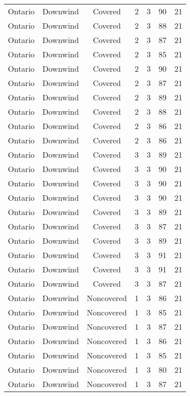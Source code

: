 \documentclass{article}
\begin{document}
\begin{longtable}[H]{ccccccc}
Ontario & Downwind & Covered     & 2 & 3    & 90  & 21 \\
Ontario & Downwind & Covered     & 2 & 3    & 88  & 21 \\
Ontario & Downwind & Covered     & 2 & 3    & 87  & 21 \\
Ontario & Downwind & Covered     & 2 & 3    & 85  & 21 \\
Ontario & Downwind & Covered     & 2 & 3    & 90  & 21 \\
Ontario & Downwind & Covered     & 2 & 3    & 87  & 21 \\
Ontario & Downwind & Covered     & 2 & 3    & 89  & 21 \\
Ontario & Downwind & Covered     & 2 & 3    & 88  & 21 \\
Ontario & Downwind & Covered     & 2 & 3    & 86  & 21 \\
Ontario & Downwind & Covered     & 2 & 3    & 86  & 21 \\
Ontario & Downwind & Covered     & 3 & 3    & 89  & 21 \\
Ontario & Downwind & Covered     & 3 & 3    & 90  & 21 \\
Ontario & Downwind & Covered     & 3 & 3    & 90  & 21 \\
Ontario & Downwind & Covered     & 3 & 3    & 90  & 21 \\
Ontario & Downwind & Covered     & 3 & 3    & 89  & 21 \\
Ontario & Downwind & Covered     & 3 & 3    & 87  & 21 \\
Ontario & Downwind & Covered     & 3 & 3    & 89  & 21 \\
Ontario & Downwind & Covered     & 3 & 3    & 91  & 21 \\
Ontario & Downwind & Covered     & 3 & 3    & 91  & 21 \\
Ontario & Downwind & Covered     & 3 & 3    & 87  & 21 \\
Ontario & Downwind & Noncovered & 1 & 3    & 86  & 21 \\
Ontario & Downwind & Noncovered & 1 & 3    & 85  & 21 \\
Ontario & Downwind & Noncovered & 1 & 3    & 87  & 21 \\
Ontario & Downwind & Noncovered & 1 & 3    & 86  & 21 \\
Ontario & Downwind & Noncovered & 1 & 3    & 85  & 21 \\
Ontario & Downwind & Noncovered & 1 & 3    & 80  & 21 \\
Ontario & Downwind & Noncovered & 1 & 3    & 87  & 21 \\

\end{longtable}
\end{document}
